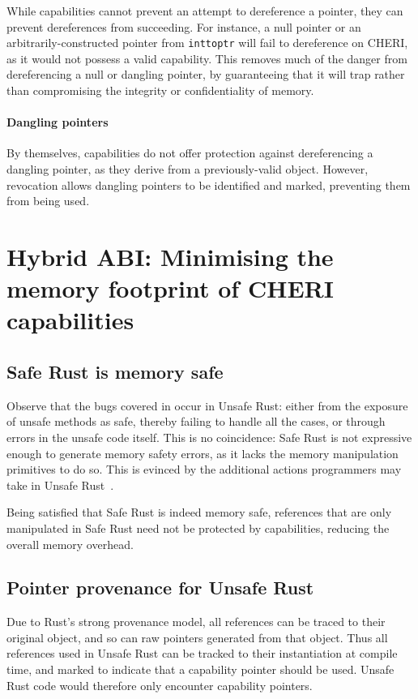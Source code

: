 \documentclass[dissertation.tex]{subfiles}
\begin{document}
While capabilities cannot prevent an attempt to dereference a pointer,
they can prevent dereferences from succeeding.
For instance, a null pointer or an arbitrarily-constructed pointer from
\texttt{inttoptr} will fail to dereference on CHERI, as it would not
possess a valid capability.
This removes much of the danger from dereferencing a null or dangling
pointer, by guaranteeing that it will trap rather than compromising the
integrity or confidentiality of memory.

\paragraph{Dangling pointers}
By themselves, capabilities do not offer protection against
dereferencing a dangling pointer, as they derive from a previously-valid
object.
However, revocation allows dangling pointers to be identified and
marked, preventing them from being used.


\section{Hybrid ABI: Minimising the memory footprint of CHERI capabilities}
\label{sec:eval-hybrid}

\subsection{Safe Rust is memory safe}
Observe that the bugs covered in  occur in Unsafe
Rust: either from the exposure of unsafe methods as safe, thereby
failing to handle all the cases, or through errors in the unsafe code
itself.
This is no coincidence: Safe Rust is not expressive enough to generate
memory safety errors, as it lacks the memory manipulation primitives to
do so.
This is evinced by the additional actions programmers may take in Unsafe
Rust~\cite{rust-nomicon-safe-unsafe}.

Being satisfied that Safe Rust is indeed memory safe, references that
are only manipulated in Safe Rust need not be protected by capabilities,
reducing the overall memory overhead.


\subsection{Pointer provenance for Unsafe Rust}
Due to Rust's strong provenance model, all references can be traced to
their original object, and so can raw pointers generated from that
object.
Thus all references used in Unsafe Rust can be tracked to their
instantiation at compile time, and marked to indicate that a capability
pointer should be used.
Unsafe Rust code would therefore only encounter capability pointers.
\end{document}
